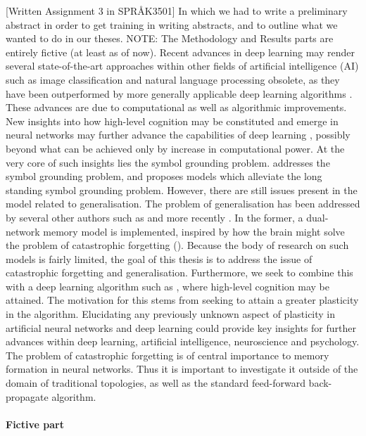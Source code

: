 [Written Assignment 3 in SPRÅK3501] In which we had to write a preliminary abstract in order to get training in writing abstracts, and to outline what we wanted to do in our theses.
NOTE: The Methodology and Results parts are entirely fictive (at least as of now).
\newline
\newline
Recent advances in deep learning may render several state-of-the-art approaches within other fields of artificial intelligence (AI) such as image classification and natural language processing obsolete, as they have been outperformed by more generally applicable deep learning algorithms \cite{LeCun2015, Schmidhuber2014}.  These advances are due to computational as well as algorithmic improvements. New insights into how high-level cognition may be constituted and emerge in neural networks may further advance the capabilities of deep learning \cite{Tani2014}, possibly beyond what can be achieved only by increase in computational power. At the very core of such insights lies the symbol grounding problem. \cite{Tani2014} addresses the symbol grounding problem, and proposes models which alleviate the long standing symbol grounding problem. However, there are still issues present in the model related to generalisation. The problem of generalisation has been addressed by several other authors such as \cite{McClelland1995} and more recently \cite{Hattori2014}. In the former, a dual-network memory model is implemented, inspired by how the brain might solve the problem of catastrophic forgetting (\cite{McCloskey1989, French1992}). Because the body of research on such models is fairly limited, the goal of this thesis is to address the issue of catastrophic forgetting and generalisation. Furthermore, we seek to combine this with a deep learning algorithm such as \cite{Tani2014}, where high-level cognition may be attained. The motivation for this stems from seeking to attain a greater plasticity in the algorithm. Elucidating any previously unknown aspect of plasticity in artificial neural networks and deep learning could provide key insights for further advances within deep learning, artificial intelligence, neuroscience and psychology. The problem of catastrophic forgetting is of central importance to memory formation in neural networks. Thus it is important to investigate it outside of the domain of traditional topologies, as well as the standard feed-forward back-propagate algorithm.
\\\\
\textbf{Fictive part}
\\
